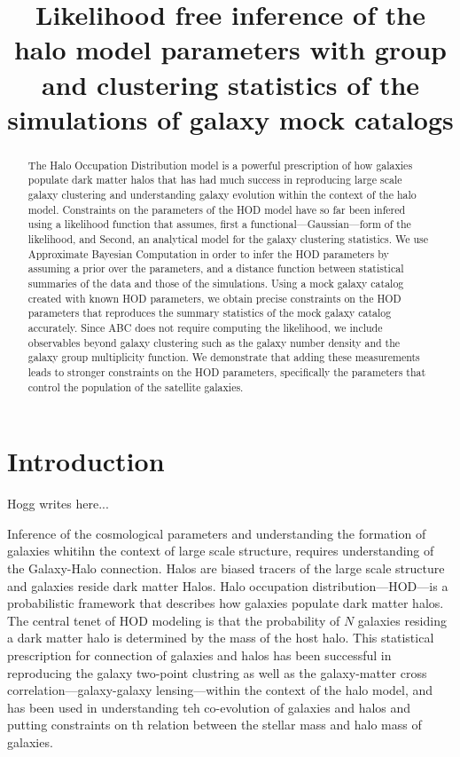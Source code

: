 \documentclass[12pt, preprint]{aastex}
\begin{document}
\title{Likelihood free inference of the halo model parameters with group and clustering 
       statistics of the simulations of galaxy mock catalogs}

\begin{abstract}

The Halo Occupation Distribution model is a powerful prescription of how galaxies populate 
dark matter halos that has had much success in reproducing large scale galaxy clustering and understanding
galaxy evolution within the context of the halo model. Constraints on the parameters of the HOD model have 
so far been infered using a likelihood function that assumes, first a functional---Gaussian---form of the likelihood, 
and Second, an analytical model for the galaxy clustering statistics. We use Approximate Bayesian Computation 
in order to infer the HOD parameters by assuming a prior over the parameters, and a distance function between 
statistical summaries of the data and those of the simulations.
Using a mock galaxy catalog created with known HOD parameters, we obtain precise constraints on the HOD parameters that 
reproduces the summary statistics of the mock galaxy catalog accurately. 
Since ABC does not require computing the likelihood, we include observables beyond galaxy clustering such as 
the galaxy number density and the galaxy group multiplicity function. 
We demonstrate that adding these measurements leads to stronger constraints on the HOD parameters, specifically the parameters 
that control the population of the satellite galaxies.

\end{abstract}

\section{Introduction}

Hogg writes here...

Inference of the cosmological parameters and understanding the formation of galaxies whitihn the context of large scale 
structure, requires understanding of the Galaxy-Halo connection. Halos are biased tracers of the large scale structure 
and galaxies reside dark matter Halos. Halo occupation distribution---HOD---is a probabilistic framework that describes how 
galaxies populate dark matter halos. The central tenet of HOD modeling is that the probability of $N$ galaxies residing a 
dark matter halo is determined by the mass of the host halo. This statistical prescription for connection of galaxies and halos 
has been successful in reproducing the galaxy two-point clustring as well as the galaxy-matter cross correlation---galaxy-galaxy 
lensing---within the context of the halo model, and has been used in understanding teh co-evolution of galaxies and halos and putting 
constraints on th relation between the stellar mass and halo mass of galaxies.
\end{document}
